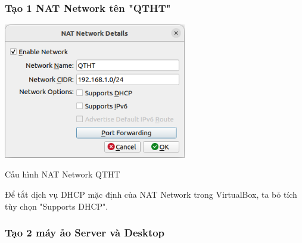 \documentclass[a4paper, 11pt]{article}
\begin{document}
\subsubsection{Tạo 1 NAT Network tên "QTHT"}

\begin{minipage}{\linewidth}
    \captionsetup{type=figure}
    \centering
    \includegraphics[width=8cm]{images/create-nat.png}
    \caption{Cấu hình NAT Network QTHT}
\end{minipage}

Để tắt dịch vụ DHCP mặc định của NAT Network trong VirtualBox, ta bỏ tích tùy chọn "Supports DHCP".

\subsubsection{Tạo 2 máy ảo Server và Desktop}
\end{document}
